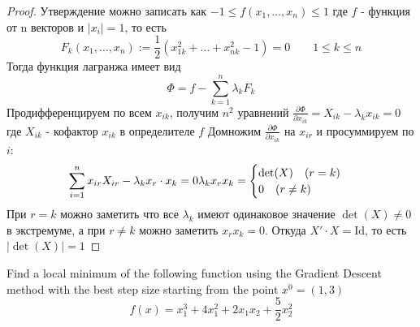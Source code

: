 \begin{proof}
    Утверждение можно записать как $-1 \leqslant f(x_1, \ldots, x_n) \leqslant 1$ где $f$ - функция от n векторов и $|x_i| = 1$, то есть
    $$
    F_k (x_1, \ldots, x_n) := \frac{1}{2} (x_{1k}^2 + \ldots + x_{nk}^2 - 1) = 0\qquad 1 \leqslant k \leqslant n
    $$
    Тогда функция лагранжа имеет вид
    $$
    \Phi = f - \sum\limits_{k = 1}^{n} \lambda_k F_k
    $$
    Продифференцируем по всем $x_{ik}$, получим $n^2$ уравнений
    $\frac{\partial \Phi}{\partial x_{ik}} = X_{ik} - \lambda_k x_{ik} = 0$
    где $X_{ik}$ - кофактор $x_{ik}$ в определителе $f$
    Домножим $\frac{\partial \Phi}{\partial x_{ik}}$ на $x_{ir}$ и просуммируем по $i$:
    $$
    \sum\limits_{i=1}^{n} x_{ir} X_{ir} - \lambda_k x_r \cdot x_k = 0\\
    \lambda_k x_r x_k = 
    \begin{cases}
        \det(X)\quad (r = k)\\
        0\quad (r \ne k)
    \end{cases}
    $$
    При $r = k$ можно заметить что все $\lambda_k$ имеют одинаковое значение $\det(X) \ne 0$ в экстремуме, а при $r \ne k$ можно заметить $x_r x_k = 0$. Откуда $X' \cdot X = \text{Id}$, то есть $|\det(X)| = 1$
\end{proof}
\vskip 0.4in





\begin{prob}
    Find a local minimum of the following function using the Gradient Descent method with the best step size starting from the point $x^0=(1,3)$
    $$
    f(x)=x_1^3+4 x_1^2+2 x_1 x_2+\frac{5}{2} x_2^2
    $$
\end{prob}

